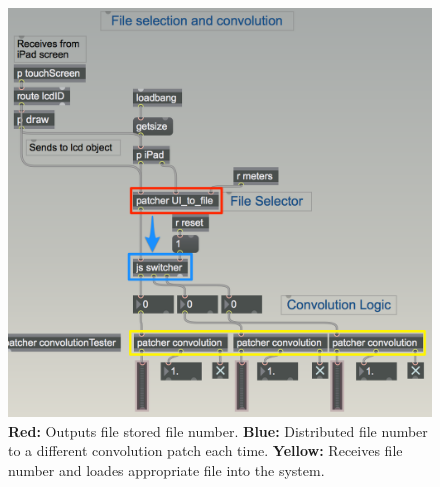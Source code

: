 \documentclass[../../main.tex]{subfiles}
\begin{document}
			\begin{figure}[H]
				\centerline{\includegraphics[scale = 0.5]{Sections/Implementation/Max/images/Max/Iteration3/fileSelectionConvolution_Edit.png}}
				\caption{\textbf{Red:} Outputs file stored file number. \textbf{Blue:} Distributed file number to a different convolution patch each time. \textbf{Yellow:} Receives file number and loades appropriate file into the system.}
				\label{overviewIteration3}
			\end{figure}
\end{document}
